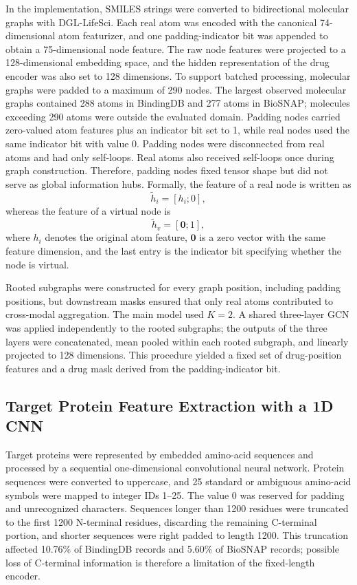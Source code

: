 \documentclass[computers,article,submit,moreauthors]{Definitions/mdpi}
\begin{document}
In the implementation, SMILES strings were converted to bidirectional molecular graphs with DGL-LifeSci. Each real atom was encoded with the canonical 74-dimensional atom featurizer, and one padding-indicator bit was appended to obtain a 75-dimensional node feature. The raw node features were projected to a 128-dimensional embedding space, and the hidden representation of the drug encoder was also set to 128 dimensions. To support batched processing, molecular graphs were padded to a maximum of 290 nodes. The largest observed molecular graphs contained 288 atoms in BindingDB and 277 atoms in BioSNAP; molecules exceeding 290 atoms were outside the evaluated domain. Padding nodes carried zero-valued atom features plus an indicator bit set to 1, while real nodes used the same indicator bit with value 0. Padding nodes were disconnected from real atoms and had only self-loops. Real atoms also received self-loops once during graph construction. Therefore, padding nodes fixed tensor shape but did not serve as global information hubs. Formally, the feature of a real node is written as
\begin{equation}
\tilde{h}_i = [h_i; 0],
\end{equation}
whereas the feature of a virtual node is
\begin{equation}
\tilde{h}_v = [\mathbf{0}; 1],
\end{equation}
where $h_i$ denotes the original atom feature, $\mathbf{0}$ is a zero vector with the same feature dimension, and the last entry is the indicator bit specifying whether the node is virtual.

Rooted subgraphs were constructed for every graph position, including padding positions, but downstream masks ensured that only real atoms contributed to cross-modal aggregation. The main model used $K=2$. A shared three-layer GCN was applied independently to the rooted subgraphs; the outputs of the three layers were concatenated, mean pooled within each rooted subgraph, and linearly projected to 128 dimensions. This procedure yielded a fixed set of drug-position features and a drug mask derived from the padding-indicator bit.

\subsection{Target Protein Feature Extraction with a 1D CNN}
Target proteins were represented by embedded amino-acid sequences and processed by a sequential one-dimensional convolutional neural network. Protein sequences were converted to uppercase, and 25 standard or ambiguous amino-acid symbols were mapped to integer IDs 1--25. The value 0 was reserved for padding and unrecognized characters. Sequences longer than 1200 residues were truncated to the first 1200 N-terminal residues, discarding the remaining C-terminal portion, and shorter sequences were right padded to length 1200. This truncation affected 10.76\% of BindingDB records and 5.60\% of BioSNAP records; possible loss of C-terminal information is therefore a limitation of the fixed-length encoder.
\end{document}
